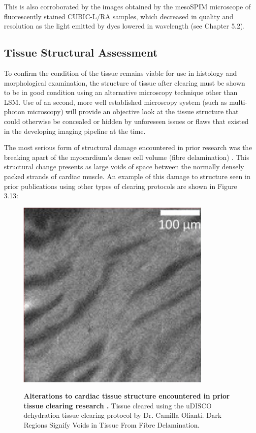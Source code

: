 This is also corroborated by the images obtained by the mesoSPIM microscope of fluorescently stained CUBIC-L/RA samples, which decreased in quality and resolution as the light emitted by dyes lowered in wavelength (see Chapter 5.2). 

\subsection{Tissue Structural Assessment}

To confirm the condition of the tissue remains viable for use in histology and morphological examination, the structure of tissue after clearing must be shown to be in good condition using an alternative microscopy technique other than LSM. Use of an second, more well established microscopy system (such as multi-photon microscopy) will provide an objective look at the tissue structure that could otherwise be concealed or hidden by unforeseen issues or flaws that existed in the developing imaging pipeline at the time.

The most serious form of structural damage encountered in prior research was the breaking apart of the myocardium's dense cell volume (fibre delamination) \cite{olianti_optical_2021}. This structural change presents as large voids of space between the normally densely packed strands of cardiac muscle. An example of this damage to structure seen in prior publications using other types of clearing protocols are shown in Figure 3.13:

\begin{figure}[H]
\centering
\includegraphics[width=0.5\linewidth]{Images/Camilla Picture.jpg}
\label{fig:enter-label}
\caption{\textbf{Alterations to cardiac tissue structure encountered in prior tissue clearing research \cite{olianti_optical_2021}.} Tissue cleared using the uDISCO dehydration tissue clearing protocol by Dr. Camilla Olianti. Dark Regions Signify Voids in Tissue From Fibre Delamination.}
\end{figure}

